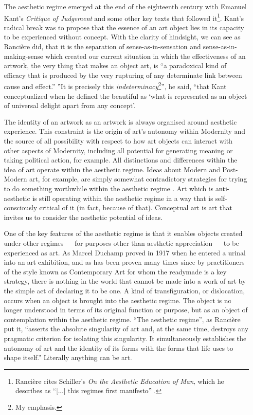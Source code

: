 \documentclass[letterpaper]{article}
\begin{document}
    The aesthetic regime emerged at the end of the eighteenth century with Emanuel Kant's \emph{Critique of Judgement} and some other key texts that followed it\footnote{
        Rancière cites Schiller's \emph{On the Aesthetic Education of Man}, which he describes as “[...] this regimes first manifesto” \citep[pp.23-24]{RancierPltcsOfThAsthtcs2004}.
    }. Kant's radical break was to propose that the essence of an art object lies in its capacity to be experienced without concept. With the clarity of hindsight, we can see as Rancière did, that it is the separation of sense-as-in-sensation and sense-as-in-making-sense which created our current situation in which the effectiveness of an artwork, the very thing that makes an object art, is “a paradoxical kind of efficacy that is produced by the very rupturing of any determinate link between cause and effect.” \citep[p.51]{RancierThEmncptdSpcttr2009} ”It is precisely this \emph{indeterminacy}\footnote{
        My emphasis.
    }”, he said, “that Kant conceptualized when he defined the beautiful as ‘what is represented as an object of universal delight apart from any concept’. \citep[p.52]{RancierThEmncptdSpcttr2009}

    The identity of an artwork as an artwork is always organised around aesthetic experience. This constraint is the origin of art's autonomy within Modernity and the source of all possibility with respect to how art objects can interact with other aspects of Modernity, including all potential for generating meaning or taking political action, for example. All distinctions and differences within the idea of art operate within the aesthetic regime. Ideas about Modern and Post-Modern art, for example, are simply somewhat contradictory strategies for trying to do something worthwhile within the aesthetic regime \citep[p213]{ZepkeSblmArt2017}. Art which is anti-aesthetic is still operating within the aesthetic regime in a way that is self-consciously critical of it (in fact, because of that). Conceptual art is art that invites us to consider the aesthetic potential of ideas.

    One of the key features of the aesthetic regime is that it enables objects created under other regimes — for purposes other than aesthetic appreciation — to be experienced as art. As Marcel Duchamp proved in 1917 when he entered a urinal into an art exhibition, and as has been proven many times since by practitioners of the style known as Contemporary Art for whom the readymade is a key strategy, there is nothing in the world that cannot be made into a work of art by the simple act of declaring it to be one. A kind of transfiguration, or dislocation, occurs when an object is brought into the aesthetic regime. The object is no longer understood in terms of its original function or purpose, but as an object of contemplation within the aesthetic regime. “The aesthetic regime”, as Rancière put it, “asserts the absolute singularity of art and, at the same time, destroys any pragmatic criterion for isolating this singularity. It simultaneously establishes the autonomy of art and the identity of its forms with the forms that life uses to shape itself.” Literally anything can be art.
    
\end{document}
